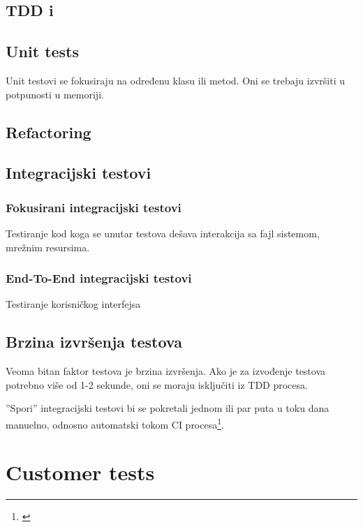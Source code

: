 \documentclass[times, utf8, seminar]{fit}
\begin{document}
\section{TDD i }



\section{Unit tests}

Unit testovi se fokusiraju na određenu klasu ili metod. Oni se trebaju izvršiti u potpunosti u memoriji.\citep[str. 300]{agileart}

\section{Refactoring}

\section{Integracijski testovi}

\subsection{Fokusirani integracijski testovi}

Testiranje kod koga se unutar testova dešava interakcija sa fajl sistemom, mrežnim resursima.

\subsection{End-To-End integracijski testovi}

Testiranje korisničkog interfejsa

\section{Brzina izvršenja testova}

Veoma bitan faktor testova je brzina izvršenja. Ako je za izvođenje testova potrebno više od 1-2 sekunde, oni se moraju isključiti iz TDD procesa. 

''Spori'' integracijski testovi bi se pokretali jednom ili par puta u toku dana manuelno, odnosno automatski tokom CI procesa\footnote{\citep{agileci}}.

\chapter{Customer tests}
\end{document}
